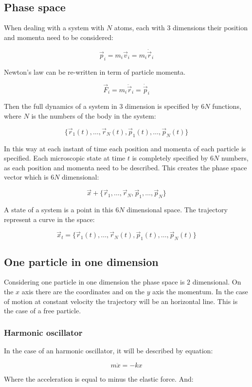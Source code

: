 	\subsection{Phase space}
	When dealing with a system with $N$ atoms, each with $3$ dimensions their position and momenta need to be considered:

	$$\vec{p}_i = m_i\vec{v}_i = m_i\dot{\vec{r}}_i$$

	Newton's law can be re-written in term of particle momenta.

	$$\vec{F}_i = m_i\ddot{\vec{r}}_i = \dot{\vec{p}}_i$$

	Then the full dynamics of a system in $3$ dimension is specified by $6N$ functions, where $N$ is the numbers of the body in the system:

	$$\{\vec{r}_1(t), \dots, \vec{r}_N(t), \vec{p}_1(t), \dots, \vec{p}_N(t)\}$$

	In this way at each instant of time each position and momenta of each particle is specified.
	Each microscopic state at time $t$ is completely specified by $6N$ numbers, as each position and momenta need to be described.
	This creates the phase space vector which is $6N$ dimensional:

	$$\vec{x} + \{\vec{r}_1, \dots, \vec{r}_N, \vec{p}_1, \dots, \vec{p}_N\}$$

	A state of a system is a point in this $6N$ dimensional space.
	The trajectory represent a curve in the space:

	$$\vec{x}_t = \{\vec{r}_1(t), \dots, \vec{r}_N(t), \vec{p}_1(t), \dots, \vec{p}_N(t)\}$$

	\subsection{One particle in one dimension}
	Considering one particle in one dimension the phase space is $2$ dimensional.
	On the $x$ axis there are the coordinates and on the $y$ axis the momentum.
	In the case of motion at constant velocity the trajectory will be an horizontal line.
	This is the case of a free particle.

		\subsubsection{Harmonic oscillator}
		In the case of an harmonic oscillator, it will be described by equation:

		$$m\ddot{x} = -kx$$

		Where the acceleration is equal to minus the elastic force.
		And:

